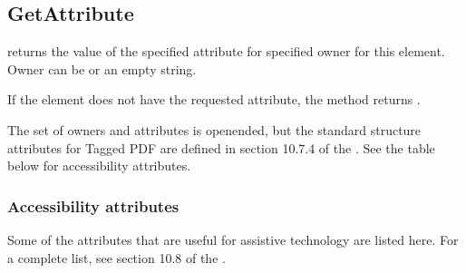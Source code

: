 \documentclass[letterpaper,12pt,english,openany,oneside]{sphinxmanual}
\begin{document}
\subsection{GetAttribute}
\label{\detokenize{Access_DOM:getattribute}}
 returns the value of the specified attribute for specified owner for this element. Owner can be  or an empty string.

If the element does not have the requested attribute, the method returns  .

The set of owners and attributes is open\sphinxhyphen{}ended, but the standard structure attributes for Tagged PDF are defined in section 10.7.4 of the  . See the table below for accessibility attributes.

\begin{sphinxVerbatim}[commandchars=\\\{\}]
        
\end{sphinxVerbatim}


\subsubsection{Accessibility attributes}
\label{\detokenize{Access_DOM:accessibility-attributes}}
Some of the attributes that are useful for assistive technology are listed here. For a complete list, see section 10.8 of the  .
\end{document}
